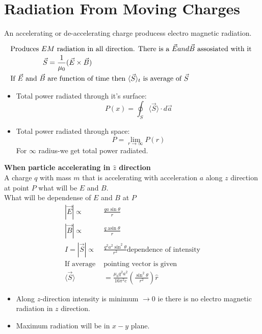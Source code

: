 \section{Radiation From Moving Charges}
An accelerating or de-accelerating charge producess electro magnetic radiation.
\begin{align*}
\intertext{Produces $EM$ radiation in all direction. There is a $\vec{E} and \vec{B}$ assosiated with it }
\vec{S}&=\frac{1}{\mu_{0}}(\vec{E} \times \vec{B})\\
\text{If $\vec{E}$ and $\vec{B}$ }&\text{are function of time then $\langle\vec{S}\rangle_{t}$ is average of $\vec{S}$}
\end{align*}
\begin{itemize}
	\item Total power radiated through it's surface:
	$$P(x)=\oint_{S}\langle\vec{S}\rangle \cdot d \vec{a}$$
	\item Total power radiated through space:
	$$P=\lim _{r \rightarrow \infty} P(r)$$
	For $\infty$ radius-we get total power radiated.\\
\end{itemize}
\textbf{When particle accelerating in $\hat{z}$ direction}\\
A charge $q$ with mass $m$ that is accelerating with acceleration $a$ along $z$ direction at point $P$ what will be $E$ and $B$.\\
What will be dependense of $E$ and $B$ at $P$
\begin{align*}
|\vec{E}| \propto &\frac{q a \sin \theta}{r}\\
|\vec{B}| \propto &\frac{q \operatorname{asin} \theta}{r}\\
I=|\vec{S}| \propto& \frac{q^{2} a^{2} \sin ^{2} \theta}{r^{2}}\text{dependence of intensity}\\
\text{If average }&\text{pointing vector is given}\\
\langle\vec{S}\rangle&=\frac{\mu_{0} q^{2} a^{2}}{16 \pi^{2} c}\left(\frac{\sin ^{2} \theta}{r^{2}}\right) \hat{r}
\end{align*}
\begin{itemize}
	\item Along $z$-direction intensity is minimum $\rightarrow 0$ ie there is no electro magnetic radiation in $z$ direction. 
	\item Maximum radiation will be in $x-y$ plane.
\end{itemize}
